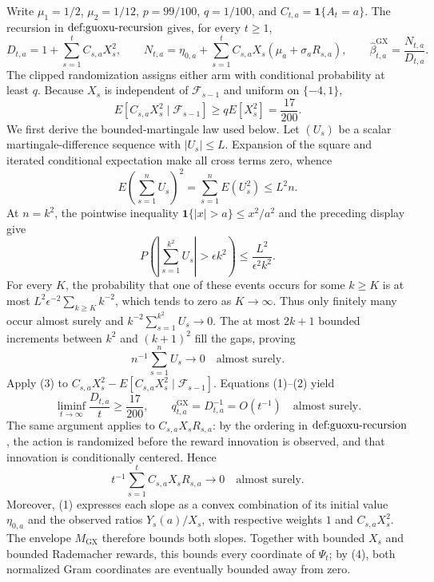 Write \(\mu_1=1/2\), \(\mu_2=1/12\), \(p=99/100\), \(q=1/100\), and \(C_{t,a}=\mathbf 1\{A_t=a\}\). The recursion in \(\textnormal{def:guoxu-recursion}\) gives, for every \(t\geq1\),
\[
 D_{t,a}=1+\sum_{s=1}^t C_{s,a}X_s^2,\qquad
 N_{t,a}=\eta_{0,a}+\sum_{s=1}^t C_{s,a}X_s(\mu_a+\sigma_aR_{s,a}),\qquad
 \widehat\beta^{\mathrm{GX}}_{t,a}=\frac{N_{t,a}}{D_{t,a}}. \tag{1}
\]
The clipped randomization assigns either arm with conditional probability at least \(q\). Because \(X_s\) is independent of \(\mathcal F_{s-1}\) and uniform on \(\{-4,1\}\),
\[
 E[C_{s,a}X_s^2\mid\mathcal F_{s-1}]
 \geq qE[X_s^2]=\frac{17}{200}. \tag{2}
\]
We first derive the bounded-martingale law used below. Let \((U_s)\) be a scalar martingale-difference sequence with \(|U_s|\leq L\). Expansion of the square and iterated conditional expectation make all cross terms zero, whence
\[
 E\left(\sum_{s=1}^nU_s\right)^2=\sum_{s=1}^nE(U_s^2)\leq L^2n.
\]
At \(n=k^2\), the pointwise inequality \(\mathbf 1\{|x|>a\}\leq x^2/a^2\) and the preceding display give
\[
 P\left(\left|\sum_{s=1}^{k^2}U_s\right|>\epsilon k^2\right)
 \leq \frac{L^2}{\epsilon^2k^2}.
\]
For every \(K\), the probability that one of these events occurs for some \(k\geq K\) is at most \(L^2\epsilon^{-2}\sum_{k\geq K}k^{-2}\), which tends to zero as \(K\to\infty\). Thus only finitely many occur almost surely and \(k^{-2}\sum_{s=1}^{k^2}U_s\to0\). The at most \(2k+1\) bounded increments between \(k^2\) and \((k+1)^2\) fill the gaps, proving
\[
 n^{-1}\sum_{s=1}^nU_s\longrightarrow0\quad\text{almost surely}. \tag{3}
\]
Apply (3) to \(C_{s,a}X_s^2-E[C_{s,a}X_s^2\mid\mathcal F_{s-1}]\). Equations (1)--(2) yield
\[
 \liminf_{t\to\infty}\frac{D_{t,a}}t\geq\frac{17}{200},
 \qquad q^{\mathrm{GX}}_{t,a}=D_{t,a}^{-1}=O(t^{-1})
 \quad\text{almost surely}. \tag{4}
\]
The same argument applies to \(C_{s,a}X_sR_{s,a}\): by the ordering in \(\textnormal{def:guoxu-recursion}\), the action is randomized before the reward innovation is observed, and that innovation is conditionally centered. Hence
\[
 t^{-1}\sum_{s=1}^tC_{s,a}X_sR_{s,a}\longrightarrow0
 \quad\text{almost surely}. \tag{5}
\]
Moreover, (1) expresses each slope as a convex combination of its initial value \(\eta_{0,a}\) and the observed ratios \(Y_s(a)/X_s\), with respective weights \(1\) and \(C_{s,a}X_s^2\). The envelope \(M_{\mathrm{GX}}\) therefore bounds both slopes. Together with bounded \(X_s\) and bounded Rademacher rewards, this bounds every coordinate of \(\Psi_t\); by (4), both normalized Gram coordinates are eventually bounded away from zero.

